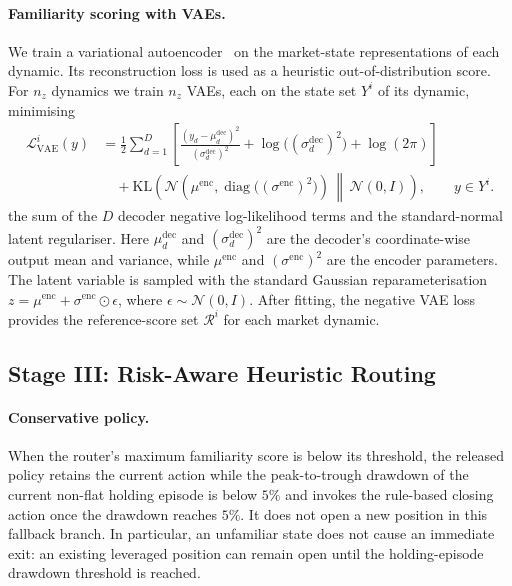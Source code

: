 \paragraph{Familiarity scoring with VAEs.} We train a variational autoencoder~\cite{kingma2013auto} on the market-state representations of each dynamic. Its reconstruction loss is used as a heuristic out-of-distribution score. For $n_z$ dynamics we train $n_z$ VAEs, each on the state set $Y^i$ of its dynamic, minimising
\begin{equation}
\label{eq:fineft_vae}
\begin{aligned}
\mathcal{L}_{\mathrm{VAE}}^i(y)
&= \frac{1}{2}\sum_{d=1}^{D}
\left[
\frac{(y_d-\mu^{\mathrm{dec}}_d)^2}{(\sigma^{\mathrm{dec}}_d)^2}
+\log\!\bigl((\sigma^{\mathrm{dec}}_d)^2\bigr)+\log(2\pi)
\right] \\
&\quad+\mathrm{KL}\!\left(
\mathcal{N}\!\left(\mu^{\mathrm{enc}},\operatorname{diag}\!\bigl((\sigma^{\mathrm{enc}})^2\bigr)\right)
\,\middle\|\,
\mathcal{N}(0,I)
\right),\qquad y\in Y^i.
\end{aligned}
\end{equation}
the sum of the $D$ decoder negative log-likelihood terms and the standard-normal latent regulariser. Here $\mu_d^{\mathrm{dec}}$ and $(\sigma_d^{\mathrm{dec}})^2$ are the decoder's coordinate-wise output mean and variance, while $\mu^{\mathrm{enc}}$ and $(\sigma^{\mathrm{enc}})^2$ are the encoder parameters. The latent variable is sampled with the standard Gaussian reparameterisation $z=\mu^{\mathrm{enc}}+\sigma^{\mathrm{enc}}\odot\epsilon$, where $\epsilon\sim\mathcal{N}(0,I)$. After fitting, the negative VAE loss provides the reference-score set $\mathcal{R}^i$ for each market dynamic.

\subsection{Stage III: Risk-Aware Heuristic Routing}
\label{sec:fineft_stage3}

\paragraph{Conservative policy.} When the router's maximum familiarity score is below its threshold, the released policy retains the current action while the peak-to-trough drawdown of the current non-flat holding episode is below $5\%$ and invokes the rule-based closing action once the drawdown reaches $5\%$. It does not open a new position in this fallback branch. In particular, an unfamiliar state does not cause an immediate exit: an existing leveraged position can remain open until the holding-episode drawdown threshold is reached.

